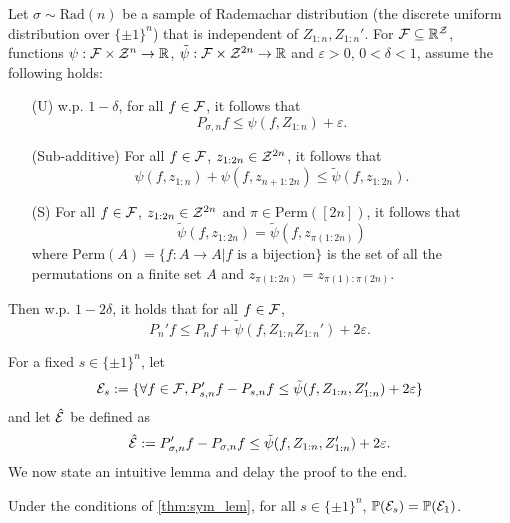 \documentclass[twoside]{article}
\begin{document}
\begin{theorem}\label{thm:sym_lem}
   Let $\sigma\sim \mathrm{Rad}(n)$ be a sample of Rademachar distribution (the discrete uniform distribution over $\{\pm 1\}^n$) that is independent of $Z_{1:n}, Z_{1:n}'$. For $\mathcal{F}\subseteq \mathbb{R}^{\mathcal{Z}}$, functions $\psi:\mathcal{F}\times \mathcal{Z}^n\to \mathbb{R}$, $\tilde \psi:\mathcal{F}\times \mathcal{Z}^{2n}\to\mathbb{R}$ and $\varepsilon>0$, $0<\delta<1$, assume the following holds:
   \begin{enumerate}
      \item[(U)] w.p. $1-\delta$, for all $f\in \mathcal{F}$, it follows that \[P_{\sigma,n}f\le \psi(f,Z_{1:n})+\varepsilon.\]
      \item[(Sub-additive)] For all $f\in \mathcal{F}$, $z_{1:2n}\in \mathcal{Z}^{2n}$, it follows that \[\psi(f,z_{1:n})+\psi(f,z_{n+1:2n})\le \tilde\psi(f,z_{1:2n}).\]
      \item[(S)] For all $f\in \mathcal{F}$, $z_{1:2n}\in \mathcal{Z}^{2n}$ and $\pi\in \mathrm{Perm}([2n])$, it follows that
      \[\tilde \psi(f,z_{1:2n})=\tilde \psi(f,z_{\pi(1:2n)})\]
      where $\mathrm{Perm}(A)=\{f:A\to A\vert f \text{ is a bijection}\}$ is the set of all the permutations on a finite set $A$ and $z_{\pi(1:2n)}=z_{\pi(1):\pi(2n)}$.
   \end{enumerate}
   Then w.p. $1-2\delta$, it holds that for all $f\in \mathcal{F}$,
   \begin{equation*}
      P_n'f\le P_nf+\tilde\psi(f,Z_{1:n}Z_{1:n}')+2\varepsilon.
   \end{equation*}
\end{theorem}
For a fixed $s\in \{\pm 1\}^n$, let \[\mathcal{E}_s:=\{\forall f\in \mathcal{F}, P_{s,n}'f-P_{s,n}f\le \tilde\psi(f,Z_{1:n}, Z_{1:n}')+2\varepsilon\}\] and let $\hat {\mathcal{E}}$ be defined as \begin{equation}
   {\hat{\mathcal{E}}}:={P'_{\sigma,n}f-P_{\sigma,n}f\le \tilde \psi(f,Z_{1:n},Z_{1:n}')+2\varepsilon}\label{eq:ehat}.
\end{equation} We now state an intuitive lemma and delay the proof to the end.
\begin{lemma}
   Under the conditions of \cref{thm:sym_lem}, for all $s\in \{\pm 1\}^n$, $\mathbb{P}(\mathcal{E}_s)=\mathbb{P}(\mathcal{E}_1)$.\label{lem:helper}
\end{lemma}
\end{document}
